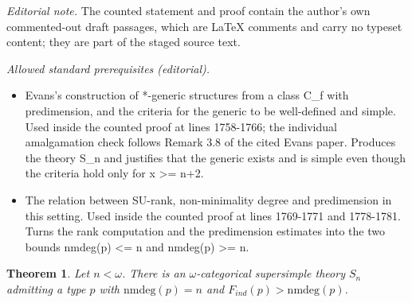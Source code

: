 \documentclass[10pt,a4paper]{amsart}
\newtheorem{theorem}{Theorem}[section]
\theoremstyle{definition}
\theoremstyle{remark}
\numberwithin{equation}{section}
\begin{document}
\noindent\textit{Editorial note.} The counted statement and proof contain the author's own commented-out draft passages, which are LaTeX comments and carry no typeset content; they are part of the staged source text.\par\medskip
\noindent\textit{Allowed standard prerequisites (editorial).}\begin{itemize}
\item Evans's construction of *-generic structures from a class C\_f with predimension, and the criteria for the generic to be well-defined and simple. Used inside the counted proof at lines 1758-1766; the individual amalgamation check follows Remark 3.8 of the cited Evans paper. Produces the theory S\_n and justifies that the generic exists and is simple even though the criteria hold only for x >= n+2.
\item The relation between SU-rank, non-minimality degree and predimension in this setting. Used inside the counted proof at lines 1769-1771 and 1778-1781. Turns the rank computation and the predimension estimates into the two bounds nmdeg(p) <= n and nmdeg(p) >= n.
\end{itemize}\medskip
\begin{theorem}\label{simpfind}
Let $n < \omega$. There is an $\omega$-categorical supersimple theory $S_n$
admitting a type $p$ with $\mathrm{nmdeg}(p) = n$ and $F_{ind}(p) >
\mathrm{nmdeg}(p)$.

\end{theorem}
\end{document}
